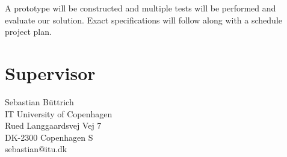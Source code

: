 \documentclass{ubicomp2012}
\begin{document}
A prototype will be constructed and multiple tests will be performed and evaluate our solution. Exact specifications will follow along with a schedule project plan.

\section{Supervisor}
Sebastian B\"uttrich\\
IT University of Copenhagen\\
Rued Langgaardsvej Vej 7\\
DK-2300 Copenhagen S\\
sebastian@itu.dk

\nocite{example-journal,example-abstracts,example-conference2}



\end{document}
